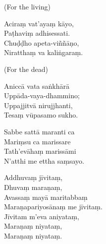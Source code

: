 
(For the living)

Aciraṃ vat'ayaṃ kāyo,\\
Paṭhaviṃ adhisessati.\\
Chuḍḍho apeta-viññāṇo,\\
Niratthaṃ va kaliṅgaraṃ. 

(For the dead)


Aniccā vata saṅkhārā\\
Uppāda-vaya-dhammino;\\
Uppajjitvā nirujjhanti,\\
Tesaṃ vūpasamo sukho. 

Sabbe sattā maranti ca\\
Mariṃsu ca marissare\\
Tath'evāhaṃ marissāmi\\
N'atthi me ettha saṃsayo.


Addhuvaṃ jīvitaṃ,\\
Dhuvaṃ maraṇaṃ,\\
Avassaṃ mayā maritabbaṃ\\
Maraṇapariyosānaṃ me jīvitaṃ.\\
Jīvitam m'eva aniyataṃ,\\
Maraṇaṃ niyataṃ,\\
Maraṇaṃ niyataṃ. 


